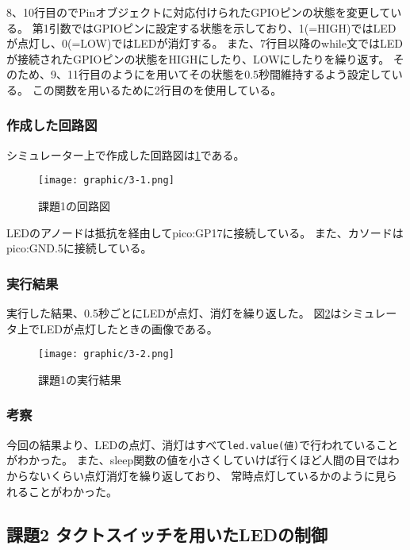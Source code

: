 \documentclass[dvipdfmx]{jsarticle}
\begin{document}
8、10行目のでPinオブジェクトに対応付けられたGPIOピンの状態を変更している。
第1引数ではGPIOピンに設定する状態を示しており、1(=HIGH)ではLEDが点灯し、0(=LOW)ではLEDが消灯する。
また、7行目以降のwhile文ではLEDが接続されたGPIOピンの状態をHIGHにしたり、LOWにしたりを繰り返す。
そのため、9、11行目のようにを用いてその状態を0.5秒間維持するよう設定している。
この関数を用いるために2行目のを使用している。

\subsubsection{作成した回路図}
シミュレーター上で作成した回路図は\ref*{fig:3-1}である。
\begin{figure}[H]
  \begin{center}
    \texttt{[image: graphic/3-1.png]}
  \end{center}
  \caption[]{課題1の回路図}
  \label{fig:3-1}
\end{figure}
LEDのアノードは抵抗を経由してpico:GP17に接続している。
また、カソードはpico:GND.5に接続している。

\subsubsection{実行結果}
実行した結果、0.5秒ごとにLEDが点灯、消灯を繰り返した。
図\ref*{fig:3-2}はシミュレータ上でLEDが点灯したときの画像である。
\begin{figure}
  \begin{center}
    \texttt{[image: graphic/3-2.png]}
  \end{center}
  \caption{課題1の実行結果}
  \label{fig:3-2}
\end{figure}

\subsubsection{考察}
今回の結果より、LEDの点灯、消灯はすべて\texttt{led.value(値)}で行われていることがわかった。
また、sleep関数の値を小さくしていけば行くほど人間の目ではわからないくらい点灯消灯を繰り返しており、
常時点灯しているかのように見られることがわかった。

\subsection{課題2 タクトスイッチを用いたLEDの制御}
\end{document}
